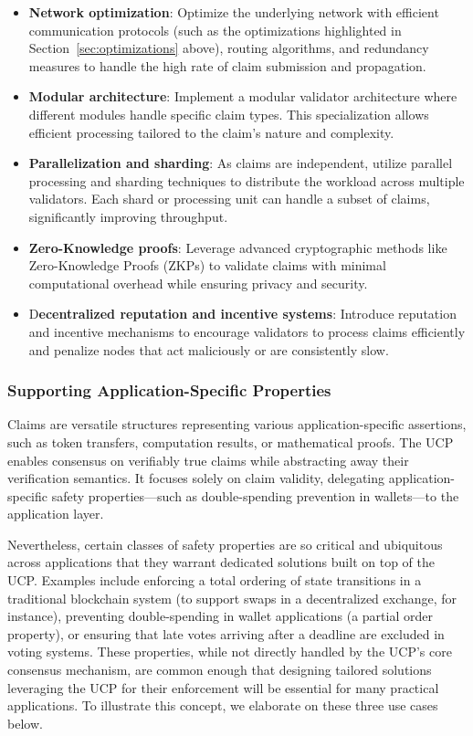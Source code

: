 \documentclass{article}
\newcommand{\UC}{UCP}
\begin{document}
\begin{itemize}
    \item \textbf{Network optimization}: Optimize the underlying network with efficient communication protocols (such as the optimizations highlighted in Section~\ref{sec:optimizations} above), routing algorithms, and redundancy measures to handle the high rate of claim submission and propagation.
    \item \textbf{Modular architecture}: Implement a modular validator architecture where different modules handle specific claim types. This specialization allows efficient processing tailored to the claim’s nature and complexity.
    \item \textbf{Parallelization and sharding}: As claims are independent, utilize parallel processing and sharding techniques to distribute the workload across multiple validators. Each shard or processing unit can handle a subset of claims, significantly improving throughput.
    \item \textbf{Zero-Knowledge proofs}: Leverage advanced cryptographic methods like Zero-Knowledge Proofs (ZKPs) to validate claims with minimal computational overhead while ensuring privacy and security.
    \item D\textbf{ecentralized reputation and incentive systems}: Introduce reputation and incentive mechanisms to encourage validators to process claims efficiently and penalize nodes that act maliciously or are consistently slow.
\end{itemize}


\subsubsection{Supporting Application-Specific Properties}
\label{sec:use-cases}

Claims are versatile structures representing various application-specific assertions, such as token transfers, computation results, or mathematical proofs. The \UC{} enables consensus on verifiably true claims while abstracting away their verification semantics. It focuses solely on claim validity, delegating application-specific safety properties—such as double-spending prevention in wallets—to the application layer.

Nevertheless, certain classes of safety properties are so critical and ubiquitous across applications that they warrant dedicated solutions built on top of the \UC{}. Examples include enforcing a total ordering of state transitions in a traditional blockchain system (to support swaps in a decentralized exchange, for instance), preventing double-spending in wallet applications (a partial order property), or ensuring that late votes arriving after a deadline are excluded in voting systems. These properties, while not directly handled by the \UC{}’s core consensus mechanism, are common enough that designing tailored solutions leveraging the \UC{} for their enforcement will be essential for many practical applications. To illustrate this concept, we elaborate on these three use cases below.
\end{document}
